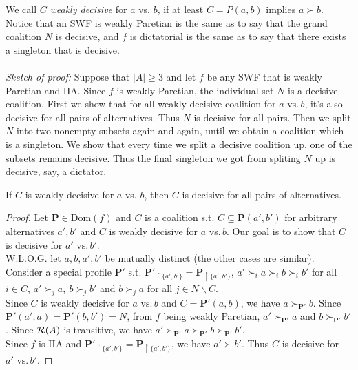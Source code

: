 We call $C$ \textit{weakly decisive} for $a$ vs. $b$, if at least $C = P(a,b)$ implies $a \succ b$. \\
\indent Notice that an SWF is weakly Paretian is the same as to say that the grand coalition $N$ is decisive, and $f$ is dictatorial is the same as to say that there exists a singleton that is decisive.\\
~\\
\textit{Sketch of proof:} Suppose that $|A| \geq 3$ and let $f$ be any SWF that is weakly Paretian and IIA. Since $f$ is weakly Paretian, the individual-set $N$ is a decisive coalition. First we show that for all weakly decisive coalition for $a$ vs.$\, b$, it's also decisive for all pairs of alternatives. Thus $N$ is decisive for all pairs. Then we split $N$ into two nonempty subsets again and again, until we obtain a coalition which is a singleton. We show that every time we split a decisive coalition up, one of the subsets remains decisive. Thus the final singleton we got from spliting $N$ up is decisive, say, a dictator.

\begin{lemma}
    \label{Contagion}
    If $C$ is weakly decisive for $a$ vs. $b$, then $C$ is decisive for all pairs of alternatives.
\end{lemma}

\begin{proof}
    Let $\mathbf{P} \in \mathrm{Dom}(f)$ and $C$ is a coalition s.t. $C \subseteq \mathbf{P}(a',b')$ for arbitrary alternatives $a',b'$ and $C$ is weakly decisive for $a$ vs.$\, b$. Our goal is to show that $C$ is decisive for $a' \mbox{ vs.}\,b'$.\\
    W.L.O.G. let $a,b,a',b'$ be mutually distinct (the other cases are similar). Consider a special profile $\mathbf{P'}$ s.t. $\mathbf{P'}_{\upharpoonright\{a',b'\}} = \mathbf{P}_{\upharpoonright\{a',b'\}}$, $a' \succ_i a \succ_i b \succ_i b'$ for all $i \in C$, $a' \succ_j a ,\  b \succ_j b'$ and $b \succ_j a$ for all $j \in N \backslash C$.\\
    Since $C$ is weakly decisive for $a \mbox{ vs.}\, b$ and $C = \mathbf{P'}(a,b)$, we have $a \succ_\mathbf{P'} b$. Since $\mathbf{P'}(a',a) = \mathbf{P'}(b,b') = N$, from $f$ being weakly Paretian, $a' \succ_\mathbf{P'} a$ and $b \succ_\mathbf{P'} b'$. Since $\mathcal{R}(A)$ is transitive, we have $a' \succ_\mathbf{P'} a \succ_\mathbf{P'} b \succ_\mathbf{P'} b'$.\\
    Since $f$ is IIA and $\mathbf{P'}_{\upharpoonright\{a',b'\}} = \mathbf{P}_{\upharpoonright\{a',b'\}}$, we have $a' \succ b'$. Thus $C$ is decisive for $a' \mbox{ vs.}\, b'$.
\end{proof}

